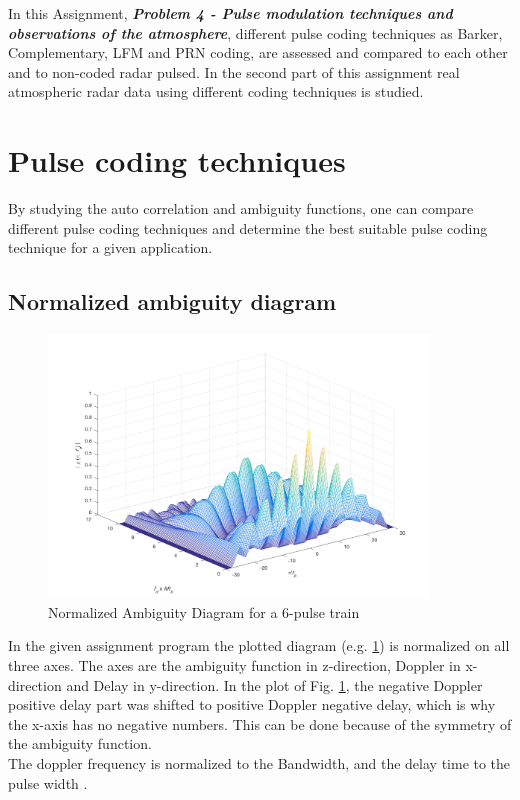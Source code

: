 

In this Assignment, \textit{\textbf{Problem 4 - Pulse modulation techniques and observations of the atmosphere}}, different pulse coding techniques as Barker, Complementary, LFM and PRN coding, are assessed and compared to each other and to non-coded radar pulsed. In the second part of this assignment real atmospheric radar data using different coding techniques is studied.


\section{Pulse coding techniques}
By studying the auto correlation and ambiguity functions, one can compare different pulse coding techniques and determine the best suitable pulse coding technique for a given application.

\subsection{Normalized ambiguity diagram}
\begin{figure}[h!]
	\centering
	\includegraphics[width=0.9\textwidth]{images/ass1_1_AmbDiag_PulseTrain}
	\caption{Normalized Ambiguity Diagram for a 6-pulse train}
	\label{fig:ambdiag1}
\end{figure}
In the given assignment program the plotted diagram (e.g. \ref{fig:ambdiag1}) is normalized on all three axes.
The axes are the ambiguity function in z-direction, Doppler in x-direction and Delay in y-direction. In the plot of Fig. \ref{fig:ambdiag1}, the negative Doppler positive delay part was shifted to positive Doppler negative delay, which is why the x-axis has no negative numbers. This can be done because of the symmetry of the ambiguity function.\\
The doppler frequency is normalized to the Bandwidth, and the delay time to the pulse width \citep{richards2010principles}.


